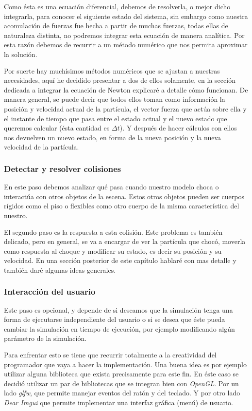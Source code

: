Como ésta es una ecuación diferencial, debemos de resolverla, o mejor dicho integrarla, para conocer el siguiente estado del sistema, sin embargo como nuestra acomulación de fuerzas fue hecha a partir de muchas fuerzas, todas ellas de naturaleza distinta, no podremos integrar esta ecuación de manera analítica.
Por esta razón debemos de recurrir a un método numérico que nos permita aproximar la solución.

Por suerte hay muchísimos métodos numéricos que se ajustan a nuestras necesidades, aquí he decidido presentar a dos de ellos solamente, en la sección dedicada a integrar la ecuación de Newton explicaré a detalle cómo funcionan.
De manera general, se puede decir que todos ellos toman como información la posición y velocidad actual de la partícula, el vector fuerza que actúa sobre ella y el instante de tiempo que pasa entre el estado actual y el nuevo estado que queremos calcular (ésta cantidad es $\Delta t$).
Y después de hacer cálculos con ellos nos devuelven un nuevo estado, en forma de la nueva posición y la nueva velocidad de la partícula.

\subsubsection{Detectar y resolver colisiones}
En este paso debemos analizar qué pasa cuando nuestro modelo choca o interactúa con otros objetos de la escena.
Estos otros objetos pueden ser cuerpos rígidos como el piso o flexibles como otro cuerpo de la misma característica del nuestro.

El segundo paso es la respuesta a esta colisión.
Este problema es también delicado, pero en general, se va a encargar de ver la partícula que chocó, moverla como respuesta al choque y modificar su estado, es decir su posición y su velocidad.
En una sección posterior de este capítulo hablaré con mas detalle y también daré algunas ideas generales.

\subsubsection{Interacción del usuario}
Este paso es opcional, y depende de si deseamos que la simulación tenga una forma de ejecutarse independiente del usuario o si se desea que éste pueda cambiar la simulación en tiempo de ejecución, por ejemplo modificando algún parámetro de la simulación.

Para enfrentar esto se tiene que recurrir totalmente a la creatividad del programador que vaya a hacer la implementación.
Una buena idea es por ejemplo utilizar alguna biblioteca que exista precisamente para este fin. En éste caso se decidió utilizar un par de bibliotecas que se integran bien con \emph{\foreignlanguage{english}{OpenGL}}.
Por un lado \emph{\foreignlanguage{english}{glfw}}, que permite manejar eventos del ratón y del teclado. 
Y por otro lado \emph{\foreignlanguage{english}{Dear Imgui}} que permite implementar una interfaz gráfica (menú) de usuario.

